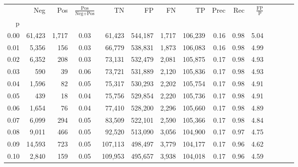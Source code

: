 \begin{tabular}{rrrcrrrrrrrrrrr}
\toprule
{} &     Neg &     Pos & $\frac{\text{Pos}}{\text{Neg}+\text{Pos}}$ &       TN &       FP &       FN &       TP &  Prec &   Rec & $\frac{\text{FP}}{\text{P}}$ \\
p    &         &         &                                            &          &          &          &          &       &       &                              \\
\midrule
0.00 &  61,423 &   1,717 &                                       0.03 &   61,423 &  544,187 &    1,717 &  106,239 &  0.16 &  0.98 &                         5.04 \\
0.01 &   5,356 &     156 &                                       0.03 &   66,779 &  538,831 &    1,873 &  106,083 &  0.16 &  0.98 &                         4.99 \\
0.02 &   6,352 &     208 &                                       0.03 &   73,131 &  532,479 &    2,081 &  105,875 &  0.17 &  0.98 &                         4.93 \\
0.03 &     590 &      39 &                                       0.06 &   73,721 &  531,889 &    2,120 &  105,836 &  0.17 &  0.98 &                         4.93 \\
0.04 &   1,596 &      82 &                                       0.05 &   75,317 &  530,293 &    2,202 &  105,754 &  0.17 &  0.98 &                         4.91 \\
0.05 &     439 &      18 &                                       0.04 &   75,756 &  529,854 &    2,220 &  105,736 &  0.17 &  0.98 &                         4.91 \\
0.06 &   1,654 &      76 &                                       0.04 &   77,410 &  528,200 &    2,296 &  105,660 &  0.17 &  0.98 &                         4.89 \\
0.07 &   6,099 &     294 &                                       0.05 &   83,509 &  522,101 &    2,590 &  105,366 &  0.17 &  0.98 &                         4.84 \\
0.08 &   9,011 &     466 &                                       0.05 &   92,520 &  513,090 &    3,056 &  104,900 &  0.17 &  0.97 &                         4.75 \\
0.09 &  14,593 &     723 &                                       0.05 &  107,113 &  498,497 &    3,779 &  104,177 &  0.17 &  0.96 &                         4.62 \\
0.10 &   2,840 &     159 &                                       0.05 &  109,953 &  495,657 &    3,938 &  104,018 &  0.17 &  0.96 &                         4.59 \\

\end{tabular}
